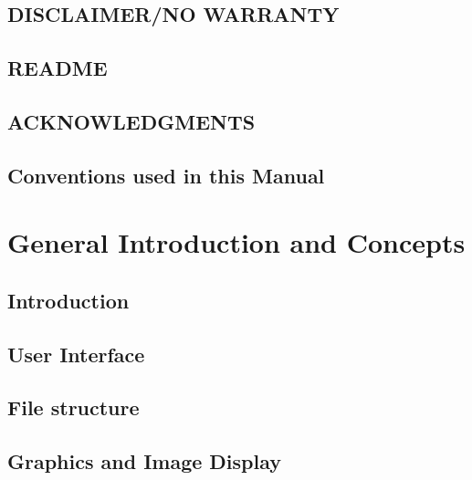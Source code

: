 \chapter*{DISCLAIMER/NO WARRANTY}


\chapter*{README}


\chapter*{ACKNOWLEDGMENTS}


\chapter*{Conventions used in this Manual}
 
\cleardoublepage
\mainmatter


\part{General Introduction and Concepts}
\chapter                {Introduction}
 
\cleardoublepage
\chapter                {User Interface}
 
\cleardoublepage
\chapter                {File structure}

\cleardoublepage
\chapter                {Graphics and Image Display}
 
